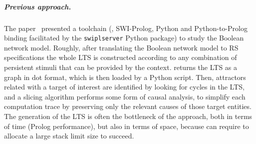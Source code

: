 \subparagraph*{Previous approach.}
The paper~\cite{datamod2023} presented a toolchain (\BioResolve, SWI-Prolog, Python and Python-to-Prolog binding facilitated by the \verb=swiplserver= Python package) to study the Boolean network model. Roughly, after translating the Boolean network model to RS specifications the whole LTS  is constructed according to any combination of persistent stimuli that can be provided by the context. \BioResolve returns the LTS as a graph in dot format, which is then loaded by a Python script. Then, attractors related with a target of interest are identified by looking for cycles in the LTS, and a slicing algorithm performs some form of causal analysis, to simplify each computation trace by preserving only the relevant causes of those target entities. 
The generation of the LTS is often the bottleneck of the approach, both in terms of time (Prolog performance), but also in terms of space, because \BioResolve can require to allocate a large stack limit size to succeed. 

% 
%

